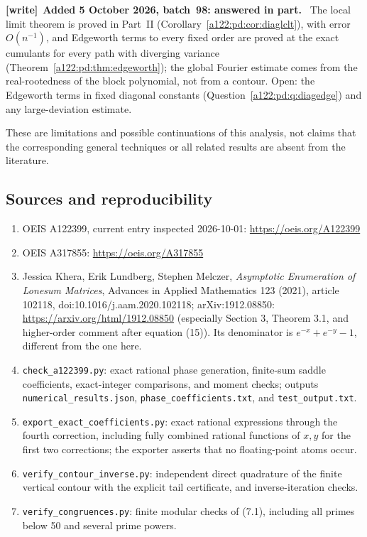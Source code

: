 \documentclass[11pt,letterpaper]{article}
\providecommand{\tightlist}{\setlength{\itemsep}{0pt}\setlength{\parskip}{0pt}}
\newenvironment{writenote}[1][]{\par\smallskip\begingroup\small
 \noindent\textbf{[write]}\if\relax\detokenize{#1}\relax\else~\textbf{#1.}\fi\ }%
 {\par\endgroup\smallskip}
\numberwithin{equation}{subsection}
\theoremstyle{definition}
\theoremstyle{remark}
\theoremstyle{plain}
\begin{document}
\begin{enumerate}
  \begin{writenote}[Added 5 October 2026, batch~98: answered in part]
  The local limit theorem is proved in Part~II
  (Corollary~\ref{a122:pd:cor:diaglclt}), with error \(O(n^{-1})\), and
  Edgeworth terms to every fixed order are proved at the exact cumulants
  for every path with diverging variance
  (Theorem~\ref{a122:pd:thm:edgeworth}); the global Fourier estimate comes
  from the real-rootedness of the block polynomial, not from a contour.
  Open: the Edgeworth terms in fixed diagonal constants
  (Question~\ref{a122:pd:q:diagedge}) and any large-deviation estimate.
  \end{writenote}
\end{enumerate}

These are limitations and possible continuations of this analysis, not claims that the corresponding general techniques or all related results are absent from the literature.

\subsection{Sources and reproducibility}\label{a122:sources-and-reproducibility}

\begin{enumerate}
\def\labelenumi{\arabic{enumi}.}
\tightlist
\item
  OEIS A122399, current entry inspected 2026-10-01: \url{https://oeis.org/A122399}
\item
  OEIS A317855: \url{https://oeis.org/A317855}
\item
  Jessica Khera, Erik Lundberg, Stephen Melczer, \emph{Asymptotic Enumeration of Lonesum Matrices}, Advances in Applied Mathematics 123 (2021), article 102118, doi:10.1016/j.aam.2020.102118; arXiv:1912.08850: \url{https://arxiv.org/html/1912.08850} (especially Section 3, Theorem 3.1, and higher-order comment after equation (15)). Its denominator is \(e^{-x}+e^{-y}-1\), different from the one here.
\item
  \nolinkurl{check_a122399.py}: exact rational phase generation, finite-sum saddle coefficients, exact-integer comparisons, and moment checks; outputs \nolinkurl{numerical_results.json}, \nolinkurl{phase_coefficients.txt}, and \nolinkurl{test_output.txt}.
\item
  \nolinkurl{export_exact_coefficients.py}: exact rational expressions through the fourth correction, including fully combined rational functions of \(x,y\) for the first two corrections; the exporter asserts that no floating-point atoms occur.
\item
  \nolinkurl{verify_contour_inverse.py}: independent direct quadrature of the finite vertical contour with the explicit tail certificate, and inverse-iteration checks.
\item
  \nolinkurl{verify_congruences.py}: finite modular checks of (7.1), including all primes below 50 and several prime powers.
\end{enumerate}
\end{document}
